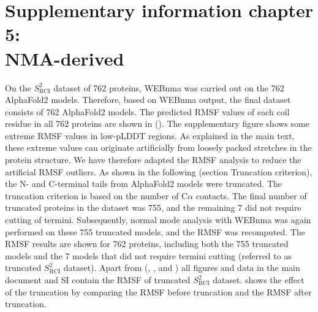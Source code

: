 \chapter*{Supplementary information chapter 5: \\NMA-derived}


\newpage


On the $S_{\text{RCI}}^{2}$ dataset of 762 proteins, WEBnma was carried out on the 762 AlphaFold2 models. Therefore, based on WEBnma output, the final dataset consists of 762 AlphaFold2 models. The predicted RMSF values of each coil residue in all 762 proteins are shown in (). The supplementary figure shows some extreme RMSF values in low-pLDDT regions. As explained in the main text, these extreme values can originate artificially from loosely packed stretches in the protein structure. We have therefore adapted the RMSF analysis to reduce the artificial RMSF outliers. As shown in the following (section Truncation criterion), the N- and C-terminal tails from AlphaFold2 models were truncated. The truncation criterion is based on the number of C$\alpha$ contacts. The final number of truncated proteins in the dataset was 755, and the remaining 7 did not require cutting of termini. Subsequently, normal mode analysis with WEBnma was again performed on these 755 truncated models, and the RMSF was recomputed. The RMSF results are shown for 762 proteins, including both the 755 truncated models and the 7 models that did not require termini cutting (referred to as truncated $S_{\text{RCI}}^{2}$ dataset). Apart from (, , and ) all figures and data in the main document and SI contain the RMSF of truncated $S_{\text{RCI}}^{2}$ dataset.  shows the effect of the truncation by comparing the RMSF before truncation and the RMSF after truncation.
\newpage

